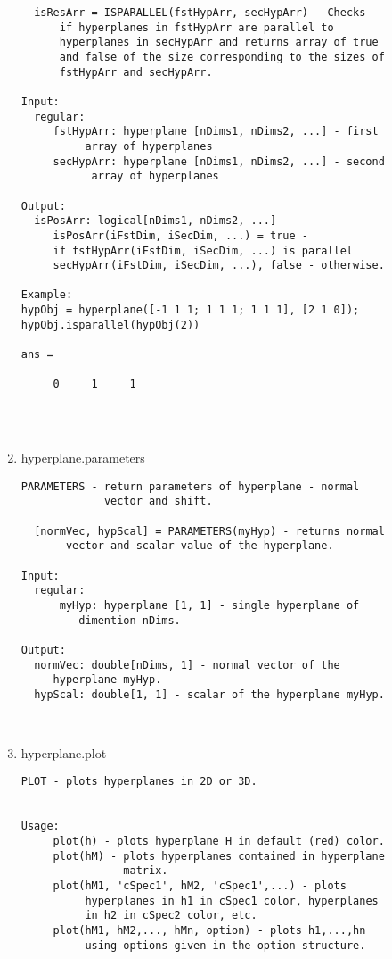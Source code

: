 \begin{enumerate}
\begin{lstlisting}
  isResArr = ISPARALLEL(fstHypArr, secHypArr) - Checks
      if hyperplanes in fstHypArr are parallel to
      hyperplanes in secHypArr and returns array of true
      and false of the size corresponding to the sizes of
      fstHypArr and secHypArr.

Input:
  regular:
     fstHypArr: hyperplane [nDims1, nDims2, ...] - first
          array of hyperplanes
     secHypArr: hyperplane [nDims1, nDims2, ...] - second
           array of hyperplanes

Output:
  isPosArr: logical[nDims1, nDims2, ...] -
     isPosArr(iFstDim, iSecDim, ...) = true -
     if fstHypArr(iFstDim, iSecDim, ...) is parallel
     secHypArr(iFstDim, iSecDim, ...), false - otherwise.

Example:
hypObj = hyperplane([-1 1 1; 1 1 1; 1 1 1], [2 1 0]);
hypObj.isparallel(hypObj(2))

ans =

     0     1     1




\end{lstlisting}
\fontfamily{\familydefault}
\selectfont
\item {hyperplane.parameters}
\selectfont
\begin{lstlisting}
PARAMETERS - return parameters of hyperplane - normal
             vector and shift.

  [normVec, hypScal] = PARAMETERS(myHyp) - returns normal
       vector and scalar value of the hyperplane.

Input:
  regular:
      myHyp: hyperplane [1, 1] - single hyperplane of
         dimention nDims.

Output:
  normVec: double[nDims, 1] - normal vector of the
     hyperplane myHyp.
  hypScal: double[1, 1] - scalar of the hyperplane myHyp.



\end{lstlisting}
\fontfamily{\familydefault}
\selectfont
\item {hyperplane.plot}
\selectfont
\begin{lstlisting}
PLOT - plots hyperplanes in 2D or 3D.


Usage:
     plot(h) - plots hyperplane H in default (red) color.
     plot(hM) - plots hyperplanes contained in hyperplane
                matrix.
     plot(hM1, 'cSpec1', hM2, 'cSpec1',...) - plots
          hyperplanes in h1 in cSpec1 color, hyperplanes
          in h2 in cSpec2 color, etc.
     plot(hM1, hM2,..., hMn, option) - plots h1,...,hn
          using options given in the option structure.


\end{lstlisting}
\end{enumerate}
